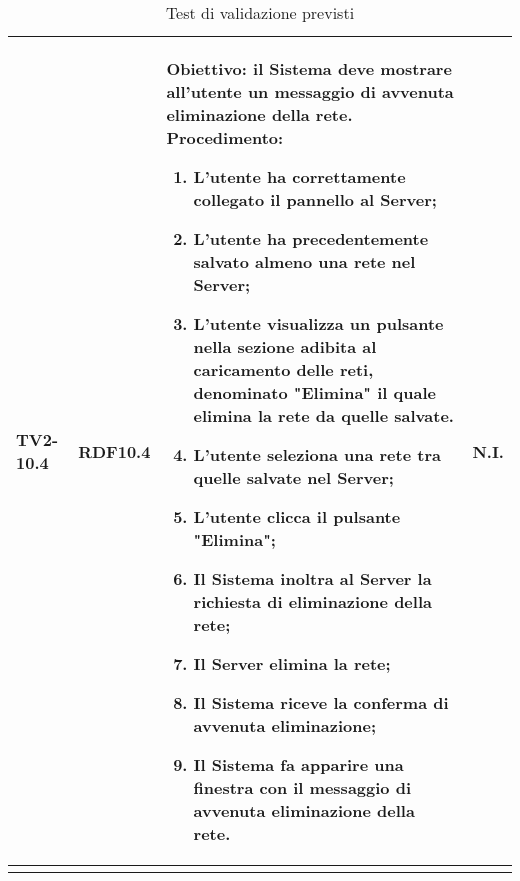 \begin{longtable}{|C{.15\textwidth}|C{.13\textwidth}|m{.52\textwidth}|C{.08\textwidth}|}
TV2-10.4 & RDF10.4 &
	\textbf{Obiettivo}: il Sistema deve mostrare all'utente un messaggio di avvenuta eliminazione della rete. \newline
	\textbf{Procedimento}:
	\begin{enumerate}
		\item L'utente ha correttamente collegato il pannello al Server;
		\item L'utente ha precedentemente salvato almeno una rete nel Server;
		\item L'utente visualizza un pulsante nella sezione adibita al caricamento delle reti, denominato "Elimina" il quale elimina la rete da quelle salvate.
		\item L'utente seleziona una rete tra quelle salvate nel Server;
		\item L'utente clicca il pulsante "Elimina";
		\item Il Sistema inoltra al Server la richiesta di eliminazione della rete;
		\item Il Server elimina la rete;
		\item Il Sistema riceve la conferma di avvenuta eliminazione;
		\item Il Sistema fa apparire una finestra con il messaggio di avvenuta eliminazione della rete.
	\end{enumerate}
	& N.I. \\
\hline








\caption{Test di validazione previsti}
\label{testvalidazioneprevisti}
\end{longtable}
